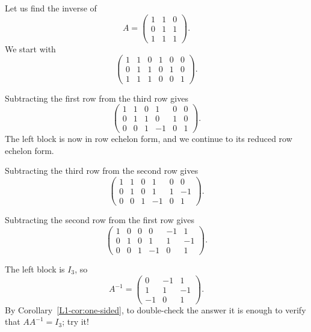 \begin{example}
    Let us find the inverse of
    \[A = \begin{pmatrix}
        1 & 1 & 0 \\
        0 & 1 & 1 \\
        1 & 1 & 1
    \end{pmatrix}.\]
    We start with
    \[\left(\begin{array}{ccc|ccc}
        1 & 1 & 0 & 1 & 0 & 0 \\
        0 & 1 & 1 & 0 & 1 & 0 \\
        1 & 1 & 1 & 0 & 0 & 1
    \end{array}\right).\]

    Subtracting the first row from the third row gives
    \[\left(\begin{array}{ccc|ccc}
        1 & 1 & 0 & 1 & 0 & 0 \\
        0 & 1 & 1 & 0 & 1 & 0 \\
        0 & 0 & 1 & -1 & 0 & 1
    \end{array}\right).\]
    The left block is now in row echelon form, and we continue to its reduced row echelon form.

    Subtracting the third row from the second row gives
    \[\left(\begin{array}{ccc|ccc}
        1 & 1 & 0 & 1 & 0 & 0 \\
        0 & 1 & 0 & 1 & 1 & -1 \\
        0 & 0 & 1 & -1 & 0 & 1
    \end{array}\right).\]

    Subtracting the second row from the first row gives
    \[\left(\begin{array}{ccc|ccc}
        1 & 0 & 0 & 0 & -1 & 1 \\
        0 & 1 & 0 & 1 & 1 & -1 \\
        0 & 0 & 1 & -1 & 0 & 1
    \end{array}\right).\]

    The left block is $I_3$, so
    \[A^{-1} = \begin{pmatrix}
        0 & -1 & 1 \\
        1 & 1 & -1 \\
        -1 & 0 & 1
    \end{pmatrix}.\]
    By Corollary~\ref{L1-cor:one-sided}, to double-check the answer it is enough to verify that $AA^{-1} = I_3$; try it!
\end{example}

